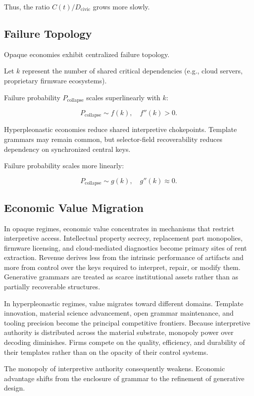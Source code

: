 \documentclass[11pt]{article}
\begin{document}
Thus, the ratio $C(t)/D_{\text{civic}}$ grows more slowly.

\subsection{Failure Topology}

Opaque economies exhibit centralized failure topology.

Let $k$ represent the number of shared critical dependencies
(e.g., cloud servers, proprietary firmware ecosystems).

Failure probability $P_{\text{collapse}}$ scales superlinearly with $k$:

\[
P_{\text{collapse}} \sim f(k), \quad f''(k) > 0.
\]

Hyperpleonastic economies reduce shared interpretive chokepoints.
Template grammars may remain common, but selector-field recoverability
reduces dependency on synchronized central keys.

Failure probability scales more linearly:

\[
P_{\text{collapse}} \sim g(k), \quad g''(k) \approx 0.
\]

\subsection{Economic Value Migration}

In opaque regimes, economic value concentrates in mechanisms that
restrict interpretive access. Intellectual property secrecy, replacement
part monopolies, firmware licensing, and cloud-mediated diagnostics
become primary sites of rent extraction. Revenue derives less from the
intrinsic performance of artifacts and more from control over the keys
required to interpret, repair, or modify them. Generative grammars are
treated as scarce institutional assets rather than as partially
recoverable structures.

In hyperpleonastic regimes, value migrates toward different domains.
Template innovation, material science advancement, open grammar
maintenance, and tooling precision become the principal competitive
frontiers. Because interpretive authority is distributed across the
material substrate, monopoly power over decoding diminishes. Firms
compete on the quality, efficiency, and durability of their templates
rather than on the opacity of their control systems.

The monopoly of interpretive authority consequently weakens. Economic
advantage shifts from the enclosure of grammar to the refinement of
generative design.
\end{document}
